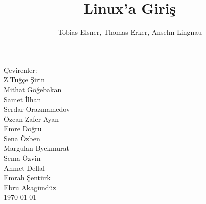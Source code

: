 \documentclass[10pt,a5paper]{book}
\begin{document}
\title{Linux'a Giriş}
\author{Tobias Elsner, Thomas Erker, Anselm Lingnau}
\renewcommand*\chaptername{Bölüm}
\maketitle
Çevirenler:\\
Z.Tuğçe Şirin\\
Mithat Göğebakan\\
Samet İlhan\\
Serdar Orazmamedov\\
Özcan Zafer Ayan\\
Emre Doğru\\
Sena Özben\\
Margulan Byekmurat\\
Sema Özvin\\
Ahmet Dellal\\
Emrah Şentürk\\
Ebru Akagündüz\\
\today
\renewcommand*\contentsname{İçindekiler}
\tableofcontents
\listoftables















\end{document}
